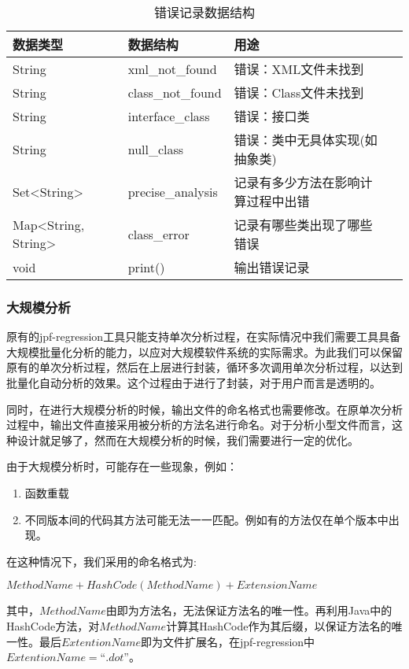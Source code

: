 \begin{table}
	\caption{错误记录数据结构}
	\label{error_data}
	\centering
	\begin{tabular}{lllc}
		\toprule[1.5pt]
		{\heiti 数据类型} &{\heiti 数据结构} & {\heiti 用途} \\\midrule[1pt]
		String & xml\_not\_found & 错误：XML文件未找到 \\
		String & class\_not\_found & 错误：Class文件未找到 \\
		String & interface\_class &  错误：接口类\\
		String & null\_class & 错误：类中无具体实现(如抽象类)\\
		Set<String> & precise\_analysis & 记录有多少方法在影响计算过程中出错\\
		Map<String, String> & class\_error & 记录有哪些类出现了哪些错误\\
		void & print() & 输出错误记录\\
		\bottomrule[1.5pt]
	\end{tabular}
\end{table}


\subsubsection{大规模分析}

原有的jpf-regression工具只能支持单次分析过程，在实际情况中我们需要工具具备大规模批量化分析的能力，以应对大规模软件系统的实际需求。为此我们可以保留原有的单次分析过程，然后在上层进行封装，循环多次调用单次分析过程，以达到批量化自动分析的效果。这个过程由于进行了封装，对于用户而言是透明的。

同时，在进行大规模分析的时候，输出文件的命名格式也需要修改。在原单次分析过程中，输出文件直接采用被分析的方法名进行命名。对于分析小型文件而言，这种设计就足够了，然而在大规模分析的时候，我们需要进行一定的优化。

由于大规模分析时，可能存在一些现象，例如：
\begin{enumerate}
	\item 函数重载
	\item 不同版本间的代码其方法可能无法一一匹配。例如有的方法仅在单个版本中出现。
\end{enumerate}

在这种情况下，我们采用的命名格式为:

$MethodName+HashCode(MethodName)+ExtensionName$

其中，$MethodName$由即为方法名，无法保证方法名的唯一性。再利用Java中的HashCode方法，对$MethodName$计算其HashCode作为其后缀，以保证方法名的唯一性。最后$ExtentionName$即为文件扩展名，在jpf-regression中$ExtentionName = “.dot”$。

